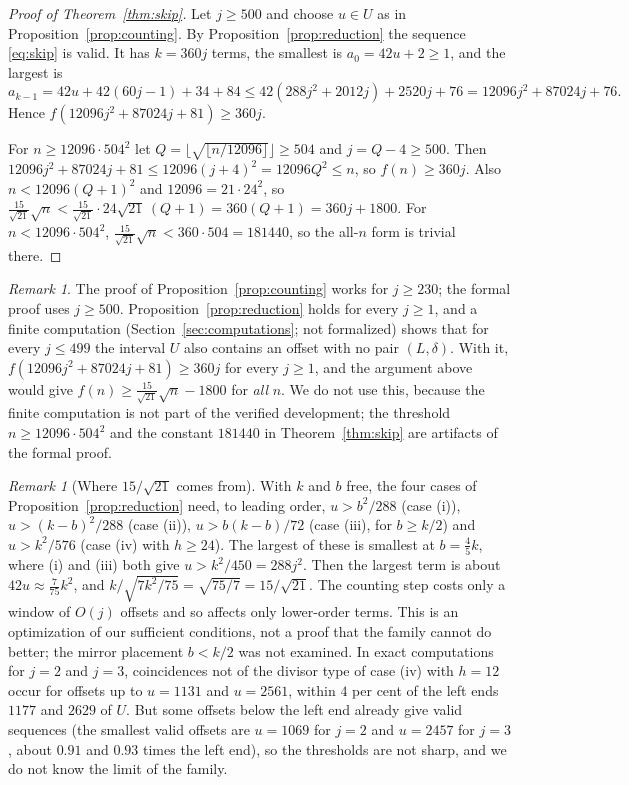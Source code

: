 \documentclass[11pt]{amsart}
\theoremstyle{remark}
\newtheorem{remark}[theorem]{Remark}
\newcommand{\isqrt}[1]{\lfloor\sqrt{#1}\rfloor}
\begin{document}
\begin{proof}[Proof of Theorem~\ref{thm:skip}]
Let $j\ge500$ and choose $u\in U$ as in Proposition~\ref{prop:counting}. By Proposition~\ref{prop:reduction} the sequence
\eqref{eq:skip} is valid. It has $k=360j$ terms, the smallest is $a_0=42u+2\ge1$, and the largest is
\[
  a_{k-1}=42u+42(60j-1)+34+84\le42(288j^2+2012j)+2520j+76=12096j^2+87024j+76 .
\]
Hence $f(12096j^2+87024j+81)\ge360j$.

For $n\ge12096\cdot504^2$ let $Q=\isqrt{\lfloor n/12096\rfloor}\ge504$ and $j=Q-4\ge500$. Then
$12096j^2+87024j+81\le12096(j+4)^2=12096Q^2\le n$, so $f(n)\ge360j$. Also $n<12096(Q+1)^2$ and $12096=21\cdot24^2$, so
$\frac{15}{\sqrt{21}}\sqrt n<\frac{15}{\sqrt{21}}\cdot24\sqrt{21}\,(Q+1)=360(Q+1)=360j+1800$. For $n<12096\cdot504^2$,
$\frac{15}{\sqrt{21}}\sqrt n<360\cdot504=181440$, so the all-$n$ form is trivial there.
\end{proof}

\begin{remark}\label{rem:j230}
The proof of Proposition~\ref{prop:counting} works for $j\ge230$; the formal proof uses $j\ge500$. Proposition~\ref{prop:reduction}
holds for every $j\ge1$, and a finite computation (Section~\ref{sec:computations}; not formalized) shows that for every $j\le499$ the
interval $U$ also contains an offset with no pair $(L,\delta)$. With it, $f(12096j^2+87024j+81)\ge360j$ for every $j\ge1$, and the
argument above would give $f(n)\ge\frac{15}{\sqrt{21}}\sqrt n-1800$ for \emph{all} $n$. We do not use this, because the finite computation
is not part of the verified development; the threshold $n\ge12096\cdot504^2$ and the constant $181440$ in Theorem~\ref{thm:skip} are
artifacts of the formal proof.
\end{remark}

\begin{remark}[Where $15/\sqrt{21}$ comes from]\label{rem:constant}
With $k$ and $b$ free, the four cases of Proposition~\ref{prop:reduction} need, to leading order, $u>b^2/288$ (case (i)),
$u>(k-b)^2/288$ (case (ii)), $u>b(k-b)/72$ (case (iii), for $b\ge k/2$) and $u>k^2/576$ (case (iv) with $h\ge24$). The largest of
these is smallest at $b=\frac45k$, where (i) and (iii) both give $u>k^2/450=288j^2$. Then the largest term is about
$42u\approx\frac{7}{75}k^2$, and $k/\sqrt{7k^2/75}=\sqrt{75/7}=15/\sqrt{21}$. The counting step costs only a window of $O(j)$ offsets
and so affects only lower-order terms. This is an optimization of our sufficient conditions, not a proof that the family cannot do
better; the mirror placement $b<k/2$ was not examined. In exact computations for $j=2$ and $j=3$, coincidences not of the divisor type of
case (iv) with $h=12$ occur for offsets up to $u=1131$ and $u=2561$, within $4$ per cent of the left ends $1177$ and $2629$ of $U$. But
some offsets below the left end already give valid sequences (the smallest valid offsets are $u=1069$ for $j=2$ and $u=2457$ for $j=3$,
about $0.91$ and $0.93$ times the left end), so the thresholds are not sharp, and we do not know the limit of the family.
\end{remark}
\end{document}
